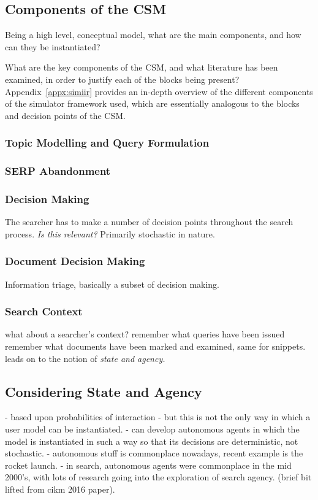 \subsection{Components of the CSM}
Being a high level, conceptual model, what are the main components, and how can they be instantiated?

What are the key components of the CSM, and what literature has been examined, in order to justify each of the blocks being present? Appendix~\ref{appx:simiir} provides an in-depth overview of the different components of the simulator framework used, which are essentially analogous to the blocks and decision points of the CSM.

\subsubsection{Topic Modelling and Query Formulation}

\subsubsection{SERP Abandonment}

\subsubsection{Decision Making}
The searcher has to make a number of decision points throughout the search process.
\emph{Is this relevant?}
Primarily stochastic in nature.

\subsubsection{Document Decision Making}
Information triage, basically a subset of decision making.

\subsubsection{Search Context}
what about a searcher's context?
remember what queries have been issued
remember what documents have been marked and examined, same for snippets.
leads on to the notion of \emph{state and agency.}

\subsection{Considering State and Agency}
- based upon probabilities of interaction
- but this is not the only way in which a user model can be instantiated.
- can develop autonomous agents in which the model is instantiated in such a way so that its decisions are deterministic, not stochastic.
- autonomous stuff is commonplace nowadays, recent example is the rocket launch.
- in search, autonomous agents were commonplace in the mid 2000's, with lots of research going into the exploration of search agency. (brief bit lifted from cikm 2016 paper).

